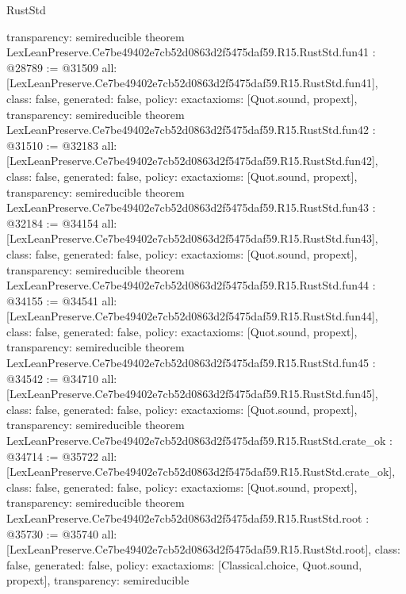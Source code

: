 \begin{lexlean}{RustStd}
\begin{coremodule}
{  transparency: semireducible
}
theorem LexLeanPreserve.Ce7be49402e7cb52d0863d2f5475daf59.R15.RustStd.fun41 : @28789 := @31509 {
  all: [LexLeanPreserve.Ce7be49402e7cb52d0863d2f5475daf59.R15.RustStd.fun41],
  class: false,
  generated: false,
  policy: exact{axioms: [Quot.sound, propext]},
  transparency: semireducible
}
theorem LexLeanPreserve.Ce7be49402e7cb52d0863d2f5475daf59.R15.RustStd.fun42 : @31510 := @32183 {
  all: [LexLeanPreserve.Ce7be49402e7cb52d0863d2f5475daf59.R15.RustStd.fun42],
  class: false,
  generated: false,
  policy: exact{axioms: [Quot.sound, propext]},
  transparency: semireducible
}
theorem LexLeanPreserve.Ce7be49402e7cb52d0863d2f5475daf59.R15.RustStd.fun43 : @32184 := @34154 {
  all: [LexLeanPreserve.Ce7be49402e7cb52d0863d2f5475daf59.R15.RustStd.fun43],
  class: false,
  generated: false,
  policy: exact{axioms: [Quot.sound, propext]},
  transparency: semireducible
}
theorem LexLeanPreserve.Ce7be49402e7cb52d0863d2f5475daf59.R15.RustStd.fun44 : @34155 := @34541 {
  all: [LexLeanPreserve.Ce7be49402e7cb52d0863d2f5475daf59.R15.RustStd.fun44],
  class: false,
  generated: false,
  policy: exact{axioms: [Quot.sound, propext]},
  transparency: semireducible
}
theorem LexLeanPreserve.Ce7be49402e7cb52d0863d2f5475daf59.R15.RustStd.fun45 : @34542 := @34710 {
  all: [LexLeanPreserve.Ce7be49402e7cb52d0863d2f5475daf59.R15.RustStd.fun45],
  class: false,
  generated: false,
  policy: exact{axioms: [Quot.sound, propext]},
  transparency: semireducible
}
theorem LexLeanPreserve.Ce7be49402e7cb52d0863d2f5475daf59.R15.RustStd.crate_ok : @34714 := @35722 {
  all: [LexLeanPreserve.Ce7be49402e7cb52d0863d2f5475daf59.R15.RustStd.crate_ok],
  class: false,
  generated: false,
  policy: exact{axioms: [Quot.sound, propext]},
  transparency: semireducible
}
theorem LexLeanPreserve.Ce7be49402e7cb52d0863d2f5475daf59.R15.RustStd.root : @35730 := @35740 {
  all: [LexLeanPreserve.Ce7be49402e7cb52d0863d2f5475daf59.R15.RustStd.root],
  class: false,
  generated: false,
  policy: exact{axioms: [Classical.choice, Quot.sound, propext]},
  transparency: semireducible
}


\end{coremodule}
\end{lexlean}
